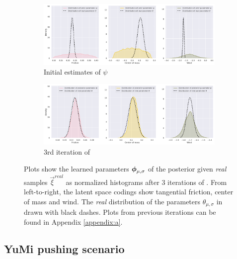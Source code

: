 \begin{figure}
\centering
\captionsetup{size=footnotesize}
\begin{subfigure}{\linewidth}
  \includegraphics[width=1.0\linewidth]{img/windyslope/latent-representation/new/iter0}
  \caption{Initial estimates of $\psi$}
  \label{fig_3_parameters_0}
\end{subfigure}
\begin{subfigure}{\textwidth}
  \includegraphics[width=1.0\linewidth]{img/windyslope/latent-representation/new/latent_encoding_iter3}
  \caption{3rd iteration of \dettostoc{}}
\end{subfigure}
\caption{Plots show the learned parameters $\boldsymbol{\phi}_{\mu, \sigma}$ of the posterior given \emph{real} samples $\vec{\xi}^{real}$ as normalized histograms after 3 iterations of \dettostoc{}.
From left-to-right, the latent space codings show tangential friction, center of mass and wind. %
The \emph{real} distribution of the parameters $\theta_{\mu, \sigma}$ in drawn with black dashes. Plots from previous iterations can be found in Appendix \ref{appendix:a}.}
\label{fig:windyslope_latent_space}
\end{figure}

\subsection{YuMi pushing scenario}


